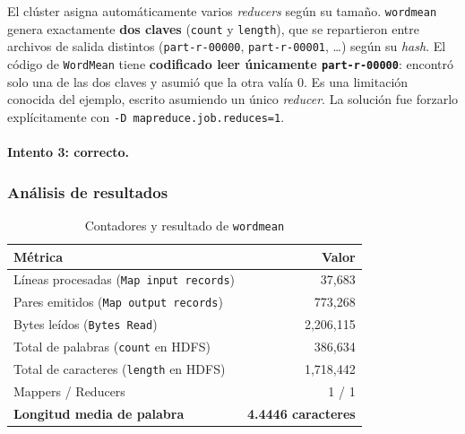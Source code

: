 El clúster asigna automáticamente varios \textit{reducers} según su tamaño. \texttt{wordmean} genera exactamente \textbf{dos claves} (\texttt{count} y \texttt{length}), que se repartieron entre archivos de salida distintos (\texttt{part-r-00000}, \texttt{part-r-00001}, \dots) según su \textit{hash}. El código de \texttt{WordMean} tiene \textbf{codificado leer únicamente \texttt{part-r-00000}}: encontró solo una de las dos claves y asumió que la otra valía 0. Es una limitación conocida del ejemplo, escrito asumiendo un único \textit{reducer}. La solución fue forzarlo explícitamente con \texttt{-\bk{}D mapreduce.\bk{}job.\bk{}reduces=\bk{}1}.


\paragraph{Intento 3: correcto.}


\subsubsection{Análisis de resultados}

\begin{table}[H]
\centering
\caption{Contadores y resultado de \texttt{wordmean}}
\label{tab:wordmean}
\vspace{0.2cm}
\small
\begin{tabular}{@{}lr@{}}
\toprule
\textbf{Métrica} & \textbf{Valor} \\
\midrule
Líneas procesadas (\texttt{Map input records})    & 37,683 \\
Pares emitidos (\texttt{Map output records})     & 773,268 \\
Bytes leídos (\texttt{Bytes Read})               & 2,206,115 \\
Total de palabras (\texttt{count} en HDFS)       & 386,634 \\
Total de caracteres (\texttt{length} en HDFS)    & 1,718,442 \\
Mappers / Reducers                               & 1 / 1 \\
\midrule
\textbf{Longitud media de palabra}               & \textbf{4.4446 caracteres} \\
\bottomrule
\end{tabular}
\end{table}

